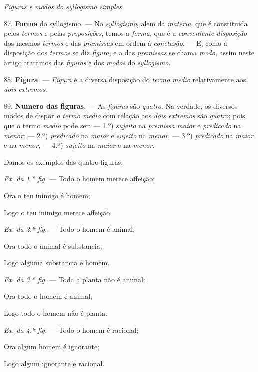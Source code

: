  \emph{Figuras e modos do syllogismo simples}

87. \textbf{Forma} do syllogismo. --- No \emph{syllogismo}, alem da \emph{materia}, que é constituida pelos \emph{termos} e pelas \emph{proposições}, temos a \emph{forma}, que é a \emph{conveniente disposição} dos mesmos \emph{termos} e das \emph{premissas} em ordem á \emph{conclusão}. --- E, como a disposição dos \emph{termos} se diz \emph{figura}, e a das \emph{premissas} se chama \emph{modo}, assim neste artigo tratamos das \emph{figuras} e dos \emph{modos} do \emph{syllogismo}.

88. \textbf{Figura}. --- \emph{Figura} é a diversa disposição do \emph{termo medio} relativamente aos \emph{dois extremos}.

89. \textbf{Numero das figuras}. --- As \emph{figuras} são \emph{quatro}. Na verdade, os diversos modos de dispor \emph{o termo medio} com relação aos \emph{dois extremos} são \emph{quatro}; pois que o termo \emph{medio} pode ser: --- 1.º) \emph{sujeito} na \emph{premissa maior} e \emph{predicado} na \emph{menor}; --- 2.º) \emph{predicado} na \emph{maior} e \emph{sujeito} na \emph{menor}, --- 3.º) \emph{predicado} na \emph{maior} e na \emph{menor}, --- 4.º) \emph{sujeito} na \emph{maior} e na \emph{menor}.

Damos os exemplos das quatro figuras:

\emph{Ex. da 1.ª fig.} --- Todo o homem merece affeição:

Ora o teu inimigo é homem;

Logo o teu inimigo merece affeição.

\emph{Ex. da 2.ª fig.} --- Todo o homem é animal;

Ora todo o animal é substancia;

Logo alguma substancia é homem.

\emph{Ex. da 3.ª fig.} --- Toda a planta não é animal;

Ora todo o homem é animal;

Logo todo o homem não é planta.

\emph{Ex. da 4.ª fig.} --- Todo o homem é racional;

Ora algum homem é ignorante;

Logo algum ignorante é racional.

